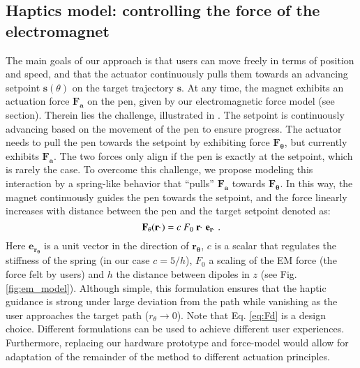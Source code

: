 \subsection{Haptics model: controlling the force of the electromagnet} \label{sc:em_costs}
The main goals of our approach is that users can move freely in terms of position and speed, and that the actuator continuously pulls them towards an advancing setpoint $\mathbf{s}(\theta)$ on the target trajectory $\mathbf{s}$.
At any time, the magnet exhibits an actuation force $\mathbf{F_a}$ on the pen,  given by our electromagnetic force model (see  section).
Therein lies the challenge, illustrated in . 
The setpoint is continuously advancing based on the movement of the pen to ensure progress.
The actuator needs to pull the pen towards the setpoint by exhibiting force $\mathbf{F_\theta}$, but currently exhibits $\mathbf{F_a}$.
The two forces only align if the pen is exactly at the setpoint, which is rarely the case.
To overcome this challenge, we propose modeling this interaction by a spring-like behavior that ``pulls'' $\mathbf{F_a}$ towards  $\mathbf{F_\theta}$.
In this way, the magnet continuously guides the pen towards the setpoint, and the force linearly increases with distance between the pen and the target setpoint denoted as:
\begin{equation}
     \mathbf{F}_{\theta} (\Rtheta) = c \ F_0 \ \mathbf{r_{\theta}} \ \mathbf{e_{r_{\theta}}} \ . \label{eq:Fd}
\end{equation}
Here $\mathbf{e_{r_{\theta}}}$ is a unit vector in the direction of $\mathbf{r_{\theta}}$, $c$ is a scalar that regulates the stiffness of the spring (in our case $c=5/h$), $F_0$ a scaling of the EM force (\ie the force felt by users) and $h$ the distance between dipoles in $z$ (see Fig. \ref{fig:em_model}). 
Although simple, this formulation ensures that the haptic guidance is strong under large deviation from the path while vanishing as the user approaches the target path ($r_{\theta} \to 0$). 
Note that Eq. \ref{eq:Fd} is a design choice. 
Different formulations can be used to achieve different user experiences. 
Furthermore, replacing our hardware prototype and force-model would allow for adaptation of the remainder of the method to different actuation principles.

